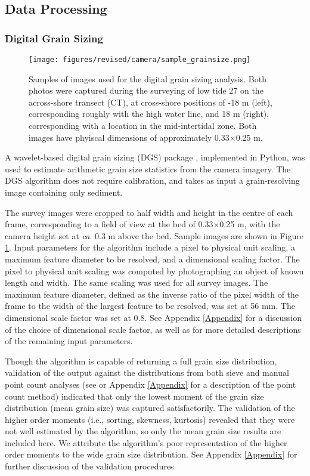 \documentclass[jmse,article,submit,pdftex,moreauthors]{Definitions/mdpi}
\begin{document}
\subsection{Data Processing}

\subsubsection{Digital Grain Sizing}\label{Methods:DGS}

\begin{figure}[tbp]
	\texttt{[image: figures/revised/camera/sample\_grainsize.png]}
	\caption[Sample photos used for sediment grain sizing]{Samples of images used for the digital grain sizing analysis. Both photos were captured during the surveying of low tide 27 on the across-shore transect (CT), at cross-shore positions of -18 m (left), corresponding roughly with the high water line, and 18 m (right), corresponding with a location in the mid-intertidal zone. Both images have phyiscal dimensions of approximately 0.33$\times$0.25 m.\label{fig:sample_grainsize}}
\end{figure}

A wavelet-based digital grain sizing (DGS) package \citep{Buscombe2013}, implemented in Python, was used to estimate arithmetic grain size statistics from the camera imagery. The DGS algorithm does not require calibration, and takes as input a grain-resolving image containing only sediment. 

The survey images were cropped to half width and height in the centre of each frame, corresponding to a field of view at the bed of 0.33$\times$0.25 m, with the camera height set at \textit{ca}. 0.3 m above the bed. Sample images are shown in Figure \ref{fig:sample_grainsize}. Input parameters for the algorithm include a pixel to physical unit scaling, a maximum feature diameter to be resolved, and a dimensional scaling factor. The pixel to physical unit scaling was computed by photographing an object of known length and width. The same scaling was used for all survey images. The maximum feature diameter, defined as the inverse ratio of the pixel width of the frame to the width of the largest feature to be resolved, was set at 56 mm. The dimensional scale factor was set at 0.8. See Appendix \ref{Appendix} for a discussion of the choice of dimensional scale factor, as well as for more detailed descriptions of the remaining input parameters. 

Though the algorithm is capable of returning a full grain size distribution, validation of the output against the distributions from both sieve and manual point count analyses (see \citep{Barnard_etal2007, Buscombe_etal2010} or Appendix \ref{Appendix} for a description of the point count method)  indicated that only the lowest moment of the grain size distribution (mean grain size) was captured satisfactorily. The validation of the higher order moments (i.e., sorting, skewness, kurtosis) revealed that they were not well estimated by the algorithm, so only the mean grain size results are included here. We attribute the algorithm's poor representation of the higher order moments to the wide grain size distribution. See Appendix \ref{Appendix} for further discussion of the validation procedures.
\end{document}
